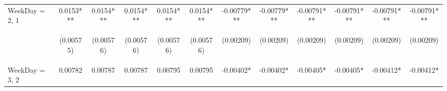 \documentclass[]{article}
\begin{document}
\begin{center}
\begin{tabular}{lccccccccccc}
WeekDay = 2, 1 & 0.0153*** & 0.0154*** & 0.0154*** & 0.0154*** & 0.0154*** & -0.00779*** & -0.00779*** & -0.00791*** & -0.00791*** & -0.00791*** & -0.00791*** \\
\vspace{4pt} & \begin{footnotesize}(0.00575)\end{footnotesize} & \begin{footnotesize}(0.00576)\end{footnotesize} & \begin{footnotesize}(0.00576)\end{footnotesize} & \begin{footnotesize}(0.00576)\end{footnotesize} & \begin{footnotesize}(0.00576)\end{footnotesize} & \begin{footnotesize}(0.00209)\end{footnotesize} & \begin{footnotesize}(0.00209)\end{footnotesize} & \begin{footnotesize}(0.00209)\end{footnotesize} & \begin{footnotesize}(0.00209)\end{footnotesize} & \begin{footnotesize}(0.00209)\end{footnotesize} & \begin{footnotesize}(0.00209)\end{footnotesize} \\
WeekDay = 3, 2 & 0.00782 & 0.00787 & 0.00787 & 0.00795 & 0.00795 & -0.00402* & -0.00402* & -0.00405* & -0.00405* & -0.00412* & -0.00412* \\

\end{tabular}
\end{center}
\end{document}
